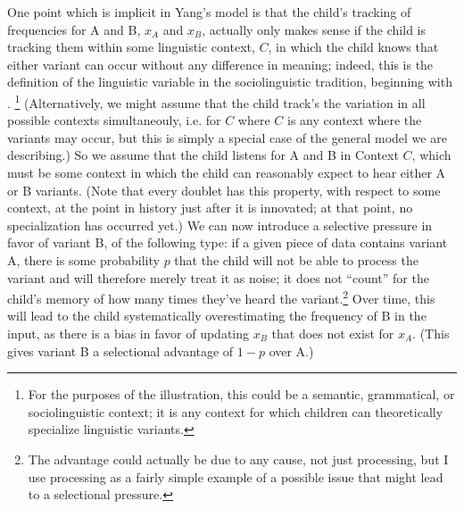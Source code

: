 One point which is implicit in Yang's model is that the child's tracking of frequencies for A and B, $x_A$ and $x_B$, actually only makes sense if the child is tracking them within some linguistic context, $C$, in which the child knows that either variant can occur without any difference in meaning; indeed, this is the definition of the linguistic variable in the sociolinguistic tradition, beginning with \citep{wlh1968}.
\footnote{For the purposes of the illustration, this could be a semantic, grammatical, or sociolinguistic context; it is any context for which children can theoretically specialize linguistic variants.}
(Alternatively, we might assume that the child track's the variation in all possible contexts simultaneouly, i.e. for $C$ where $C$ is any context where the variants may occur, but this is simply a special case of the general model we are describing.)
So we assume that the child listens for A and B in Context $C$, which must be some context in which the child can reasonably expect to hear either A or B variants.
(Note that every doublet has this property, with respect to some context, at the point in history just after it is innovated; at that point, no specialization has occurred yet.)
We can now introduce a selective pressure in favor of variant B, of the following type:
if a given piece of data contains variant A, there is some probability $p$ that the child will not be able to process the variant and will therefore merely treat it as noise; it does not ``count'' for the child's memory of how many times they've heard the variant.\footnote{The advantage could actually be due to any cause, not just processing, but I use processing as a fairly simple example of a possible issue that might lead to a selectional pressure.}
Over time, this will lead to the child systematically overestimating the frequency of B in the input, as there is a bias in favor of updating $x_B$ that does not exist for $x_A$.
(This gives variant B a selectional advantage of $1-p$ over A.)

